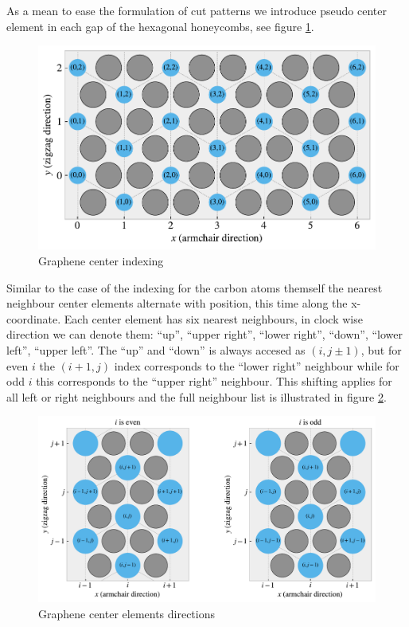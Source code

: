 As a mean to ease the formulation of cut patterns we introduce pseudo center element in each gap of the hexagonal honeycombs, see figure \ref{fig:center_indexing}. 

\begin{figure}[H]
  \centering
  \includegraphics[width=0.7\linewidth]{figures/center_indexing.pdf}
  \caption{Graphene center indexing}
  \label{fig:center_indexing}
\end{figure}




Similar to the case of the indexing for the carbon atoms themself the nearest neighbour center elements alternate with position, this time along the x-coordinate. Each center element has six nearest neighbours, in clock wise direction we can denote them: ``up'', ``upper right'', ``lower right'', ``down'', ``lower left'', ``upper left''. The ``up'' and ``down'' is always accesed as $(i,j\pm 1)$, but for even $i$ the $(i+1,j)$ index corresponds to the ``lower right'' neighbour while for odd $i$ this corresponds to the ``upper right'' neighbour. This shifting applies for all left or right neighbours and the full neighbour list is illustrated in figure \ref{fig:center_directions}. 


\begin{figure}[H]
  \centering
  \includegraphics[width=0.7\linewidth]{figures/center_directions.pdf}
  \caption{Graphene center elements directions}
  \label{fig:center_directions}
\end{figure}


